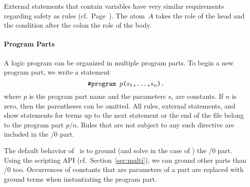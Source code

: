 \begin{note}
External statements that contain variables
have very similar requirements regarding safety as rules (cf.\ Page~\pageref{pg:safe}).
The atom~$A$ takes the role of the head
and the condition after the colon the role of the body.
\end{note}
\paragraph{Program Parts}
A logic program can be organized in multiple program parts.
To begin a new program part, we write a statement
%
\[\texttt{\#program~$p$($s_1$,\dots,$s_n$).}\]
%
where $p$ is the program part name and the parameters $s_i$ are constants.
If $n$ is zero, then the parentheses can be omitted.
All rules, external statements, and show statements for terms up to the next  statement or the end of the file belong to the program part $p/n$.
Rules that are not subject to any such directive are included in the /$0$ part.

The default behavior of \gringo\ is to ground (and solve in the case of \clingo)
the /$0$ part.
Using the scripting API (cf.\ Section~\ref{sec:multi}),
we can ground other parts than /$0$ too.
Occurrences of constants that are parameters of a part are replaced with ground terms when instantiating the program part.

